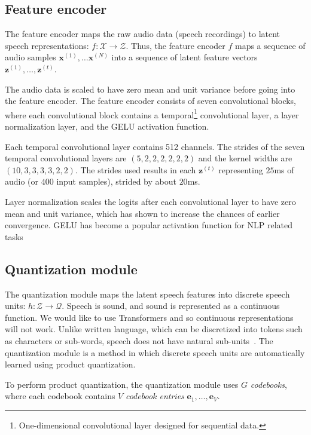 \subsection{Feature encoder}
The feature encoder maps the raw audio data (speech recordings) to latent speech representations: $f: \mathcal{X} \rightarrow \mathcal{Z}$.
Thus, the feature encoder $f$ maps a sequence of audio samples $\mathbf{x}^{(1)}, \dots \mathbf{x}^{(N)}$ into a sequence of latent feature vectors $\mathbf{z}^{(1)}, \dots, \mathbf{z}^{(t)}$.

The audio data is scaled to have zero mean and unit variance before going into the feature encoder. 
The feature encoder consists of seven convolutional blocks, where each convolutional block contains a temporal\footnote{One-dimensional convolutional layer designed for sequential data.} convolutional layer, 
a layer normalization layer, and the GELU activation function.

Each temporal convolutional layer contains 512 channels. 
The strides of the seven temporal convolutional layers are $(5,2,2,2,2,2,2)$ and the kernel widths are $(10,3,3,3,3,2,2)$.
The strides used results in each $\mathbf{z}^{(t)}$ representing $25$ms of audio (or $400$ input samples),
strided by about $20$ms.

Layer normalization scales the logits after each convolutional layer to have zero mean and unit variance, which has shown to increase the chances of earlier convergence.
GELU has become a popular activation function for NLP related tasks



\subsection{Quantization module}
The quantization module maps the latent speech features into discrete speech units: $h: \mathcal{Z} \rightarrow \mathcal{Q}$.
Speech is sound, and sound is represented as a continuous function. We would like to use Transformers and so continuous representations will not work. 
Unlike written language, which can be discretized into tokens such as characters or sub-words, speech does not have natural sub-units~\cite{bgn2021illustrated}. 
The quantization module is a method in which discrete speech units are automatically learned using product quantization.

To perform product quantization, the quantization module uses $G$ \emph{codebooks}, where each codebook contains $V$ \emph{codebook entries} $\mathbf{e}_{1}, \dots, \mathbf{e}_{V}$.

